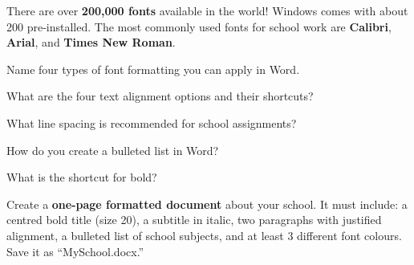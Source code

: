 \begin{funfact}
There are over \textbf{200,000 fonts} available in the world! Windows comes with about 200 pre-installed. The most commonly used fonts for school work are \textbf{Calibri}, \textbf{Arial}, and \textbf{Times New Roman}.
\end{funfact}

\begin{reviewqs}
  \item Name four types of font formatting you can apply in Word.
  \item What are the four text alignment options and their shortcuts?
  \item What line spacing is recommended for school assignments?
  \item How do you create a bulleted list in Word?
  \item What is the shortcut for bold?
\end{reviewqs}

\begin{challenge}
Create a \textbf{one-page formatted document} about your school. It must include: a centred bold title (size 20), a subtitle in italic, two paragraphs with justified alignment, a bulleted list of school subjects, and at least 3 different font colours. Save it as ``MySchool.docx.''
\end{challenge}
